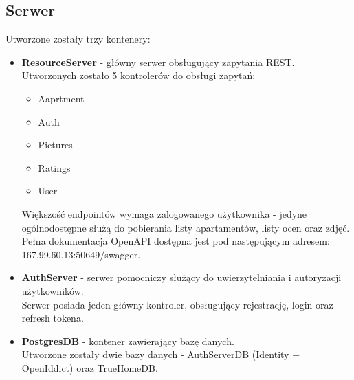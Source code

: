 \documentclass[polish, 11pt]{article}
\begin{document}
    \subsection{Serwer}
        Utworzone zostały trzy kontenery:
        \begin{itemize}
            \item \textbf{ResourceServer} - główny serwer obsługujący zapytania REST.\\
                Utworzonych zostało 5 kontrolerów do obsługi zapytań:
                \begin{itemize}
                    \item Aaprtment
                    \item Auth
                    \item Pictures
                    \item Ratings
                    \item User
                \end{itemize}
                Większość endpointów wymaga zalogowanego użytkownika - jedyne ogólnodostępne służą do pobierania listy apartamentów, listy ocen oraz zdjęć.
                Pełna dokumentacja OpenAPI dostępna jest pod następującym adresem: 167.99.60.13:50649/swagger.
                
            \item \textbf{AuthServer} - serwer pomocniczy służący do uwierzytelniania i autoryzacji użytkowników.\\
                Serwer posiada jeden główny kontroler, obsługujący rejestrację, login oraz refresh tokena.
                
            \item \textbf{PostgresDB} - kontener zawierający bazę danych.\\
                Utworzone zostały dwie bazy danych - AuthServerDB (Identity + OpenIddict) oraz TrueHomeDB.
        \end{itemize}
        
\end{document}
